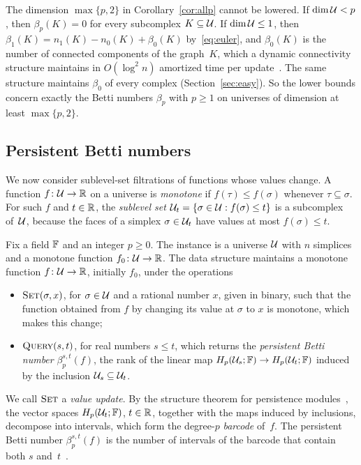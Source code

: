 The dimension $\max\{p,2\}$ in Corollary~\ref{cor:allp} cannot be lowered.
If $\dim\mathcal{U}<p$, then $\beta_p(K)=0$ for every subcomplex $K\subseteq\mathcal{U}$.
If $\dim\mathcal{U}\le1$, then $\beta_1(K)=n_1(K)-n_0(K)+\beta_0(K)$ by~\eqref{eq:euler}, and $\beta_0(K)$ is the number of connected components of the graph~$K$, which a dynamic connectivity structure maintains in $O(\log^2n)$ amortized time per update~\cite{HDT01}.
The same structure maintains $\beta_0$ of every complex (Section~\ref{sec:easy}).
So the lower bounds concern exactly the Betti numbers $\beta_p$ with $p\ge1$ on universes of dimension at least $\max\{p,2\}$.

\subsection{Persistent Betti numbers}\label{sec:lower-persistence}

We now consider sublevel-set filtrations of functions whose values change.
A function $f\colon\mathcal{U}\to\mathbb{R}$ on a universe is \emph{monotone} if $f(\tau)\le f(\sigma)$ whenever $\tau\subseteq\sigma$.
For such $f$ and $t\in\mathbb{R}$, the \emph{sublevel set} ${\mathcal{U}_t=\{\sigma\in\mathcal{U}:f(\sigma)\le t\}}$ is a subcomplex of~$\mathcal{U}$, because the faces of a simplex $\sigma\in\mathcal{U}_t$ have values at most $f(\sigma)\le t$.

\begin{problem}\label{prob:sublevel}
Fix a field $\mathbb{F}$ and an integer $p\ge0$.
The instance is a universe $\mathcal{U}$ with $n$ simplices and a monotone function $f_0\colon\mathcal{U}\to\mathbb{R}$.
The data structure maintains a monotone function $f\colon\mathcal{U}\to\mathbb{R}$, initially $f_0$, under the operations
\begin{itemize}
\item $\textsc{Set}(\sigma,x)$, for $\sigma\in\mathcal{U}$ and a rational number $x$, given in binary, such that the function obtained from $f$ by changing its value at $\sigma$ to $x$ is monotone, which makes this change;
\item $\textsc{Query}(s,t)$, for real numbers $s\le t$, which returns the \emph{persistent Betti number} $\beta_p^{s,t}(f)$, the rank of the linear map $H_p(\mathcal{U}_s;\mathbb{F})\to H_p(\mathcal{U}_t;\mathbb{F})$ induced by the inclusion $\mathcal{U}_s\subseteq\mathcal{U}_t$.
\end{itemize}
\end{problem}

We call $\textsc{Set}$ a \emph{value update}.
By the structure theorem for persistence modules~\cite{ZC05}, the vector spaces $H_p(\mathcal{U}_t;\mathbb{F})$, $t\in\mathbb{R}$, together with the maps induced by inclusions, decompose into intervals, which form the degree-$p$ \emph{barcode} of~$f$.
The persistent Betti number $\beta_p^{s,t}(f)$ is the number of intervals of the barcode that contain both $s$ and~$t$~\cite{ELZ02,EH10}.

